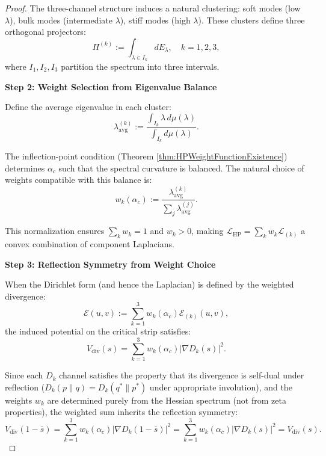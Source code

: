 \begin{theorem}
\begin{lemma}
\begin{proof}
The three-channel structure induces a natural clustering: soft modes (low $\lambda$), bulk modes (intermediate $\lambda$), stiff modes (high $\lambda$). These clusters define three orthogonal projectors:
\begin{equation}
\Pi^{(k)} := \int_{\lambda \in I_k} dE_\lambda, \quad k = 1, 2, 3,
\end{equation}
where $I_1, I_2, I_3$ partition the spectrum into three intervals.

\textbf{Step 2: Weight Selection from Eigenvalue Balance}

Define the average eigenvalue in each cluster:
\begin{equation}
\lambda_{\mathrm{avg}}^{(k)} := \frac{\int_{I_k} \lambda \, d\mu(\lambda)}{\int_{I_k} d\mu(\lambda)}.
\end{equation}

The inflection-point condition (Theorem \ref{thm:HPWeightFunctionExistence}) determines $\alpha_c$ such that the spectral curvature is balanced. The natural choice of weights compatible with this balance is:
\begin{equation}
w_k(\alpha_c) := \frac{\lambda_{\mathrm{avg}}^{(k)}}{\sum_j \lambda_{\mathrm{avg}}^{(j)}}.
\end{equation}

This normalization ensures $\sum_k w_k = 1$ and $w_k > 0$, making $\mathcal{L}_{\mathrm{HP}} = \sum_k w_k \mathcal{L}_{(k)}$ a convex combination of component Laplacians.

\textbf{Step 3: Reflection Symmetry from Weight Choice}

When the Dirichlet form (and hence the Laplacian) is defined by the weighted divergence:
\begin{equation}
\mathcal{E}(u, v) := \sum_{k=1}^3 w_k(\alpha_c) \mathcal{E}_{(k)}(u, v),
\end{equation}
the induced potential on the critical strip satisfies:
\begin{equation}
V_{\mathrm{div}}(s) = \sum_{k=1}^3 w_k(\alpha_c) |\nabla D_k(s)|^2.
\end{equation}

Since each $D_k$ channel satisfies the property that its divergence is self-dual under reflection ($D_k(p \| q) = D_k(q^* \| p^*)$ under appropriate involution), and the weights $w_k$ are determined purely from the Hessian spectrum (not from zeta properties), the weighted sum inherits the reflection symmetry:
\begin{equation}
V_{\mathrm{div}}(1-\bar{s}) = \sum_{k=1}^3 w_k(\alpha_c) |\nabla D_k(1-\bar{s})|^2 = \sum_{k=1}^3 w_k(\alpha_c) |\nabla D_k(s)|^2 = V_{\mathrm{div}}(s).
\end{equation}


\end{proof}
\end{lemma}
\end{theorem}
